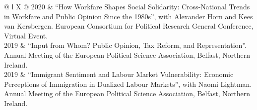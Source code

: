 \documentclass[letterpaper,fontsize=10.5pt]{scrartcl}
\begin{document}
\begin{longtblr}[entry=none,label=none]{@{} l X @{} }
	2020 & ``How Workfare Shapes Social Solidarity: Cross-National Trends in Workfare and Public Opinion Since the 1980s'', with Alexander Horn and Kees van Kersbergen. European Consortium for Political Research General Conference, Virtual Event.                                     \\

	2019 & ``Input from Whom? Public Opinion, Tax Reform, and Representation''. Annual Meeting of the European Political Science Association, Belfast, Northern Ireland.                                                                                                                   \\
	2019 & ``Immigrant Sentiment and Labour Market Vulnerability: Economic Perceptions of Immigration in Dualized Labour Markets'', with Naomi Lightman. Annual Meeting of the European Political Science Association, Belfast, Northern Ireland.                                          \\


\end{longtblr}
\end{document}
